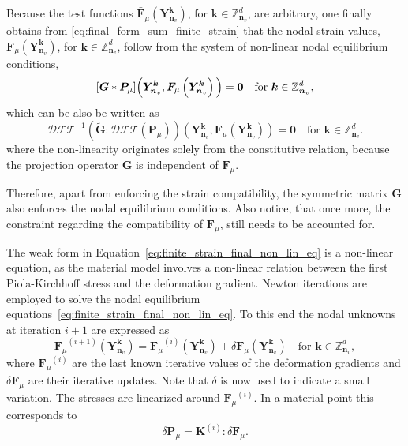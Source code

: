 Because the test functions \(\bar{\bm F}_\mu(\bm Y_{\bm n_v}^{\bm k})\), for \(\bm k\in \mathbb Z^{d}_{\bm n_v}\), are arbitrary, one finally obtains from \eqref{eq:final_form_sum_finite_strain} that the nodal strain values, \({\bm F}_\mu(\bm Y_{\bm n_v}^{\bm k})\), for \(\bm k\in \mathbb Z^{d}_{\bm n_v}\), follow from the system of non-linear nodal equilibrium conditions,
\begin{equation} \label{eq:final_form_sum}
[\bm G * \bm P_\mu]\Big(\bm Y_{\bm n_v}^{\bm k}, \bm F_\mu\left(\bm Y_{\bm n_v}^{\bm  k}\right)\Big)=\bm 0\quad \text{for \( \bm k \in \mathbb Z^d_{\bm n_v}\)},
\end{equation}
which can be also be written as
\begin{equation}\label{eq:finite_strain_final_non_lin_eq}
\mathcal{DFT}^{-1}\left(\tilde{\bm G}:\mathcal{DFT}\left(\bm P_\mu\right)\right)\left(\bm{Y}_{\bm n_v}^{\bm  k}, \bm F_\mu\left(\bm Y_{\bm n_v}^{\bm  k}\right)\right)= \bm 0\quad \text{for \(\bm k \in \mathbb Z^d_{\bm n_v}\)}.
\end{equation}
where the non-linearity originates solely from the constitutive relation, because the projection operator \(\bm G\) is independent of \(\bm F_\mu\).

Therefore, apart from enforcing the strain compatibility, the symmetric matrix \(\bm G\) also enforces the nodal equilibrium conditions.
Also notice, that once more, the constraint regarding the compatibility of \(\bm F_\mu\), still needs to be accounted for.

The weak form in Equation~\eqref{eq:finite_strain_final_non_lin_eq} is a non-linear equation, as the material model involves a non-linear relation between the first Piola-Kirchhoff stress and the deformation gradient.
Newton iterations are employed to solve the nodal equilibrium equations~\eqref{eq:finite_strain_final_non_lin_eq}.
To this end the nodal unknowns at iteration \(i+1\) are expressed as
\begin{equation} \label{eq:linearization_finite_strain}
{\bm{F}_\mu}^{(i+1)}\left(\bm Y_{\bm n_v}^{\bm  k}\right)={\bm{F}_\mu}^{(i)}\left(\bm Y_{\bm n_v}^{\bm  k}\right)+\delta {\bm{F}_\mu}\left(\bm Y_{\bm n_v}^{\bm  k}\right)\quad \text{for \(\bm k\in \mathbb Z^d_{\bm n_v}\)},
\end{equation}
where \({\bm{F}_\mu}^{(i)}\) are the last known iterative values of the deformation gradients and \(\delta {\bm{F}_\mu}\) are their iterative updates.
Note that \(\delta\) is now used to indicate a small variation.
The stresses are linearized around \({\bm{F}_\mu}^{(i)}\).
In a material point this corresponds to
\begin{equation}
\delta \bm{P}_\mu=\bm{K}^{(i)}: \delta \bm{F}_\mu.
\end{equation}


